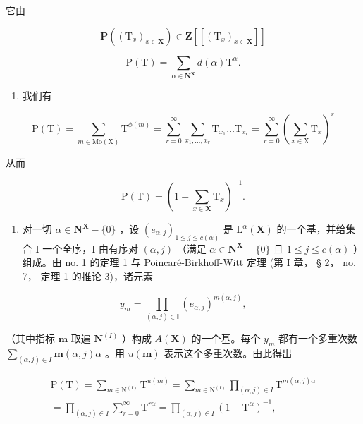 它由

\[
\mathbf {P} ((\mathrm{T} _ {x}) _ {x \in \mathbf {X}}) \in \mathbf {Z} [ [ (\mathrm{T} _ {x}) _ {x \in \mathbf {X}} ] ]\tag{17}
\]

\[
\mathrm{P} (\mathrm{T}) = \sum_ {\alpha \in \mathbf {N} ^ {\mathbf {X}}} d (\alpha) \mathrm{T} ^ {\alpha}.
\]

\begin{enumerate}
\def\labelenumi{(\arabic{enumi})}
\tightlist
\item
  我们有
\end{enumerate}

\[
\mathrm{P} (\mathrm{T}) = \sum_ {m \in \mathrm{Mo} (\mathrm{X})} \mathrm{T} ^ {\phi (m)} = \sum_ {r = 0} ^ {\infty} \sum_ {x _ {1}, \dots , x _ {r}} \mathrm{T} _ {x _ {1}} \dots \mathrm{T} _ {x _ {r}} = \sum_ {r = 0} ^ {\infty} \left(\sum_ {x \in \mathrm{X}} \mathrm{T} _ {x}\right) ^ {r}
\]

从而

\[
\mathrm{P} (\mathrm{T}) = \left(1 - \sum_ {x \in \mathbf {X}} \mathrm{T} _ {x}\right) ^ {- 1}.\tag{18}
\]

\begin{enumerate}
\def\labelenumi{(\arabic{enumi})}
\setcounter{enumi}{1}
\tightlist
\item
  对一切 \(\alpha \in \mathbf{N}^{\mathbf{X}} - \{0\}\) ，设 \((e_{\alpha,j})_{1 \leqslant j \leqslant c(\alpha)}\) 是 \(\mathrm{L}^{\alpha}(\mathbf{X})\) 的一个基，并给集合 I 一个全序，I 由有序对 \((\alpha, j)\) （满足 \(\alpha \in \mathbf{N}^{\mathbf{X}} - \{0\}\) 且 \(1 \leqslant j \leqslant c(\alpha)\) ）组成。由 no. 1 的定理 1 与 Poincaré-Birkhoff-Witt 定理 (第 I 章， § 2， no. 7， 定理 1 的推论 3)，诸元素
\end{enumerate}

\[
y _ {m} = \prod_ {(\alpha , j) \in \mathbb {I}} (e _ {\alpha , j}) ^ {m (\alpha , j)},
\]

（其中指标 \(\pmb{m}\) 取遍 \(\mathbf{N}^{(I)}\) ）构成 \(A(\mathbf{X})\) 的一个基。每个 \(y_{m}\) 都有一个多重次数 \(\sum_{(\alpha, j) \in I} \pmb{m}(\alpha, j)\alpha\) 。用 \(u(\pmb{m})\) 表示这个多重次数。由此得出

\[
\begin{array}{l} \mathrm{P(T)} = \sum_ {m \in \mathrm{N} ^ {(I)}} \mathrm{T} ^ {u (m)} = \sum_ {m \in \mathrm{N} ^ {(I)}} \prod_ {(\alpha , j) \in I} \mathrm{T} ^ {m (\alpha , j) \alpha} \\ = \prod_ {(\alpha , j) \in I} \sum_ {r = 0} ^ {\infty} \mathrm{T} ^ {r \alpha} = \prod_ {(\alpha , j) \in I} (1 - \mathrm{T} ^ {\alpha}) ^ {- 1}, \end{array}
\]

